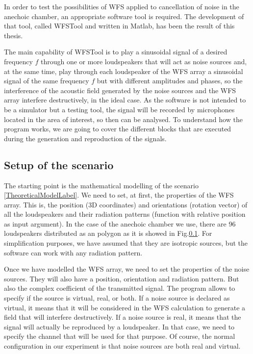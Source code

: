 In order to test the possibilities of WFS applied to cancellation of noise in the anechoic chamber, an appropriate software tool is required. The development of that tool, called WFSTool and written in Matlab, has been the result of this thesis.

The main capability of WFSTool is to play a sinusoidal signal of a desired frequency $f$ through one or more loudspeakers that will act as noise sources and, at the same time, play through each loudspeaker of the WFS array a sinusoidal signal of the same frequency $f$ but with different amplitudes and phases, so the interference of the acoustic field generated by the noise sources and the WFS array interfere destructively, in the ideal case. As the software is not intended to be a simulator but a testing tool, the signal will be recorded by microphones located in the area of interest, so then can be analysed. To understand how the program works, we are going to cover the different blocks that are executed during the generation and reproduction of the signals. 

\subsection{Setup of the scenario}
The starting point is the mathematical modelling of the scenario \ref{TheoreticalModelLabel}. We need to set, at first, the properties of the WFS array. This is, the position (3D coordinates) and orientations (rotation vector) of all the loudspeakers and their radiation patterns (function with relative position as input argument). In the case of the anechoic chamber we use, there are 96 loudspeakers distributed as an polygon as it is showed in Fig.\ref{}. For simplification purposes, we have assumed that they are isotropic sources, but the software can work with any radiation pattern.

Once we have modelled the WFS array, we need to set the properties of the noise sources. They will also have a position, orientation and radiation pattern. But also the complex coefficient of the transmitted signal. The program allows to specify if the source is virtual, real, or both. If a noise source is declared as virtual, it means that it will be considered in the WFS calculation to generate a field that will interfere destructively. If a noise source is real, it means that the signal will actually be reproduced by a loudspeaker. In that case, we need to specify the channel that will be used for that purpose. Of course, the normal configuration in our experiment is that noise sources are both real and virtual.

